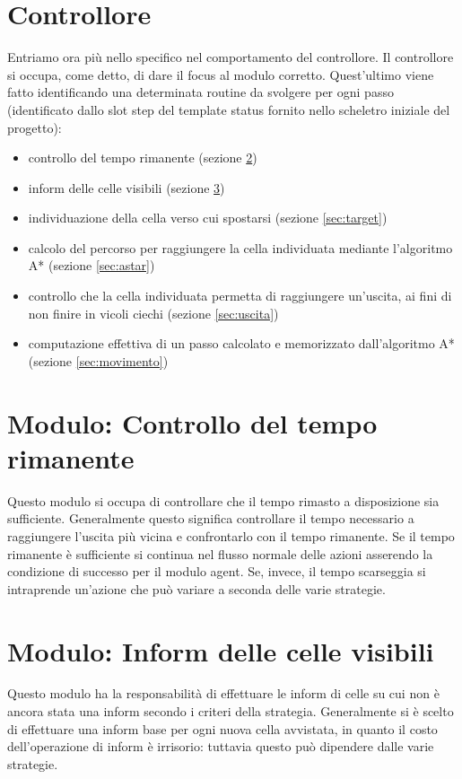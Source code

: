 \section{Controllore} \label{sec:controllore}
Entriamo ora più nello specifico nel comportamento del controllore. Il controllore si occupa, come detto, di dare il focus al modulo corretto. Quest'ultimo viene fatto identificando una determinata routine da svolgere per ogni passo (identificato dallo slot step del template status fornito nello scheletro iniziale del progetto):
\begin{itemize}
	\item controllo del tempo rimanente (sezione \ref{sec:tempo})
	\item inform delle celle visibili (sezione \ref{sec:inform})
	\item individuazione della cella verso cui spostarsi (sezione \ref{sec:target})
	\item calcolo del percorso per raggiungere la cella individuata mediante l'algoritmo A* (sezione \ref{sec:astar})
	\item controllo che la cella individuata permetta di raggiungere un'uscita, ai fini di non finire in vicoli ciechi (sezione \ref{sec:uscita})
	\item computazione effettiva di un passo calcolato e memorizzato dall'algoritmo A* (sezione \ref{sec:movimento})
\end{itemize}

\section{Modulo: Controllo del tempo rimanente} \label{sec:tempo}
Questo modulo si occupa di controllare che il tempo rimasto a disposizione sia sufficiente. Generalmente questo significa controllare il tempo necessario a raggiungere l'uscita più vicina e confrontarlo con il tempo rimanente. Se il tempo rimanente è sufficiente si continua nel flusso normale delle azioni asserendo la condizione di successo per il modulo agent. Se, invece, il tempo scarseggia si intraprende un'azione che può variare a seconda delle varie strategie.

\section{Modulo: Inform delle celle visibili} \label{sec:inform}
Questo modulo ha la responsabilità di effettuare le inform di celle su cui non è ancora stata una inform secondo i criteri della strategia. Generalmente si è scelto di effettuare una inform base per ogni nuova cella avvistata, in quanto il costo dell'operazione di inform è irrisorio: tuttavia questo può dipendere dalle varie strategie.

